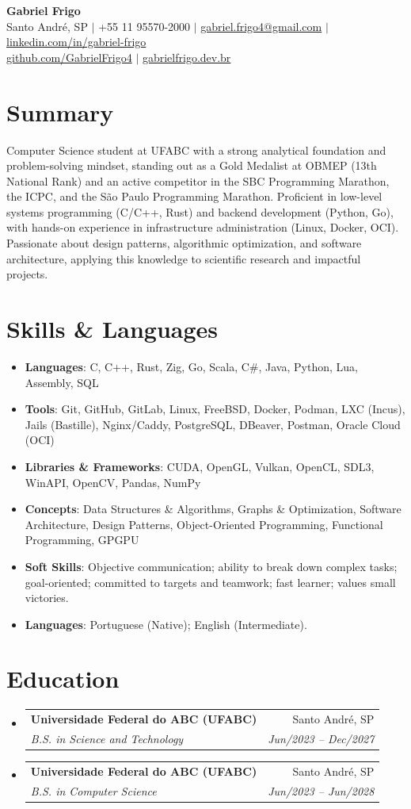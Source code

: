\documentclass[letterpaper,10pt]{article}
\makeatletter
\newcommand{\resumeItem}[1]{\item\small{#1}}
\newcommand{\resumeSubheading}[4]{
\vspace{-1pt}\item
  \begin{tabular*}{0.97\textwidth}[t]{l@{\extracolsep{\fill}}r}
    \textbf{#1} & #2 \\
    \textit{#3} & \textit{#4} \\
  \end{tabular*}\vspace{-7pt}
}
\newcommand{\resumeSubHeadingList}{\begin{itemize}[leftmargin=0.15in, label={}]}
\newcommand{\resumeSubHeadingListEnd}{\end{itemize}}
\makeatother
\begin{document}
\begin{center}
  \textbf{\Huge Gabriel Frigo} \\
  \small Santo André, SP $|$ +55 11 95570-2000 $|$ \href{mailto:gabriel.frigo4@gmail.com}{gabriel.frigo4@gmail.com} $|$
  \href{https://linkedin.com/in/gabriel-frigo-b6727b275/}{linkedin.com/in/gabriel-frigo} \\
  \href{https://github.com/GabrielFrigo4}{github.com/GabrielFrigo4} $|$
  \href{https://gabrielfrigo.dev.br}{gabrielfrigo.dev.br}
\end{center}

\section{Summary}
Computer Science student at UFABC with a strong analytical foundation and problem-solving mindset, standing out as a Gold Medalist at OBMEP (13th National Rank) and an active competitor in the SBC Programming Marathon, the ICPC, and the São Paulo Programming Marathon. Proficient in low-level systems programming (C/C++, Rust) and backend development (Python, Go), with hands-on experience in infrastructure administration (Linux, Docker, OCI). Passionate about design patterns, algorithmic optimization, and software architecture, applying this knowledge to scientific research and impactful projects.

\section{Skills \& Languages}
\resumeSubHeadingList
  \resumeItem{\textbf{Languages}: C, C++, Rust, Zig, Go, Scala, C\#, Java, Python, Lua, Assembly, SQL}
  \resumeItem{\textbf{Tools}: Git, GitHub, GitLab, Linux, FreeBSD, Docker, Podman, LXC (Incus), Jails (Bastille), Nginx/Caddy, PostgreSQL, DBeaver, Postman, Oracle Cloud (OCI)}
  \resumeItem{\textbf{Libraries \& Frameworks}: CUDA, OpenGL, Vulkan, OpenCL, SDL3, WinAPI, OpenCV, Pandas, NumPy}
  \resumeItem{\textbf{Concepts}: Data Structures \& Algorithms, Graphs \& Optimization, Software Architecture, Design Patterns, Object-Oriented Programming, Functional Programming, GPGPU}
  \resumeItem{\textbf{Soft Skills}: Objective communication; ability to break down complex tasks; goal-oriented; committed to targets and teamwork; fast learner; values small victories.}
  \resumeItem{\textbf{Languages}: Portuguese (Native); English (Intermediate).}
\resumeSubHeadingListEnd

\section{Education}
\resumeSubHeadingList
  \resumeSubheading
    {Universidade Federal do ABC (UFABC)}{Santo André, SP}
    {B.S. in Science and Technology}{Jun/2023 -- Dec/2027}
  \resumeSubheading
    {Universidade Federal do ABC (UFABC)}{Santo André, SP}
    {B.S. in Computer Science}{Jun/2023 -- Jun/2028}
\resumeSubHeadingListEnd
\end{document}
